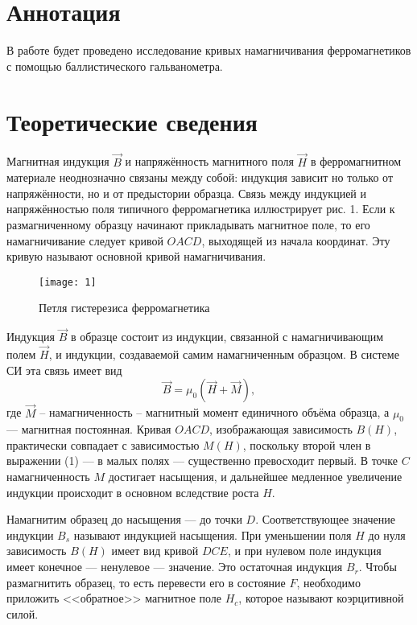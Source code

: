  
\usepackage{multicol}
\usepackage{mathrsfs}


\section{Аннотация}
В работе будет проведено исследование
кривых намагничивания ферромагнетиков с
помощью баллистического гальванометра.

\section{Теоретические сведения}

Магнитная индукция $\vec B$ и напряжённость
магнитного поля $\vec H$ в ферромагнитном
материале неоднозначно связаны между
собой: индукция зависит но только от
напряжённости, но и от предыстории
образца. Связь между индукцией и
напряжённостью поля типичного
ферромагнетика иллюстрирует рис. 1. Если
к размагниченному образцу начинают
прикладывать магнитное поле, то его
намагничивание следует кривой $OACD$,
выходящей из начала координат. Эту
кривую называют основной кривой
намагничивания.

\begin{wrapfigure}{r}{0.5\linewidth}
    \vspace{-3ex}
    \texttt{[image: 1]}
    \captionsetup{justification=centering}
    \caption{Петля гистерезиса
    ферромагнетика}
\end{wrapfigure}

Индукция $\vec B$ в образце состоит из
индукции, связанной с намагничивающим
полем $\vec H$, и индукции, создаваемой самим
намагниченным образцом. В системе СИ эта
связь имеет вид
\begin{equation}
    \vec B = \mu_0(\vec H + \vec M),
\end{equation}
где $\vec M$ -- намагниченность --
магнитный момент единичного объёма
образца, а $\mu_0$ — магнитная постоянная.
Кривая $OACD$, изображающая зависимость
$B(H)$, практически совпадает с
зависимостью $M(H)$, поскольку второй
член в выражении (1) — в малых
полях — существенно превосходит
первый. В точке $C$ 
намагниченность $M$ достигает
насыщения, и дальнейшее
медленное увеличение индукции
происходит в основном вследствие
роста $H$.

Намагнитим образец до насыщения — до
точки $D$. Соответствующее значение
индукции $B_s$ называют индукцией
насыщения. При уменьшении поля $H$ до нуля
зависимость $B(H)$ имеет вид кривой $DCE$, и
при нулевом поле индукция имеет конечное
— ненулевое — значение. Это остаточная
индукция $B_r$. Чтобы размагнитить образец,
то есть перевести его в состояние $F$,
необходимо приложить <<обратное>>
магнитное поле $H_c$, которое называют
коэрцитивной силой.

